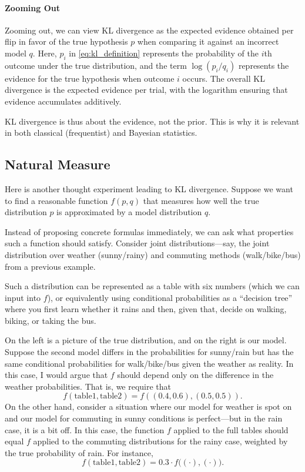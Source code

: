 \documentclass{article}
\begin{document}
\paragraph{Zooming Out}  
Zooming out, we can view KL divergence as the expected evidence obtained per flip in favor of the true hypothesis \(p\) when comparing it against an incorrect model \(q\). Here, \(p_i\) in \cref{eq:kl_definition} represents the probability of the \(i\)th outcome under the true distribution, and the term \(\log(p_i/q_i)\) represents the evidence for the true hypothesis when outcome \(i\) occurs. The overall KL divergence is the expected evidence per trial, with the logarithm ensuring that evidence accumulates additively.

KL divergence is thus about the evidence, not the prior. This is why it is relevant in both classical (frequentist) and Bayesian statistics.

\subsection{Natural Measure}


Here is another thought experiment leading to KL divergence. Suppose we want to find a reasonable function \(f(p,q)\) that measures how well the true distribution \(p\) is approximated by a model distribution \(q\).

Instead of proposing concrete formulas immediately, we can ask what properties such a function should satisfy. Consider joint distributions—say, the joint distribution over weather (sunny/rainy) and commuting methods (walk/bike/bus) from a previous example.

Such a distribution can be represented as a table with six numbers (which we can input into \(f\)), or equivalently using conditional probabilities as a ``decision tree'' where you first learn whether it rains and then, given that, decide on walking, biking, or taking the bus.

On the left is a picture of the true distribution, and on the right is our model. Suppose the second model differs in the probabilities for sunny/rain but has the same conditional probabilities for walk/bike/bus given the weather as reality. In this case, I would argue that \(f\) should depend only on the difference in the weather probabilities. That is, we require that
\[
f(\text{table1}, \text{table2}) = f((0.4, 0.6), (0.5, 0.5)).
\]
On the other hand, consider a situation where our model for weather is spot on and our model for commuting in sunny conditions is perfect—but in the rain case, it is a bit off. In this case, the function \(f\) applied to the full tables should equal \(f\) applied to the commuting distributions for the rainy case, weighted by the true probability of rain. For instance,
\[
f(\text{table1}, \text{table2}) = 0.3\cdot f\bigl((\cdot), (\cdot)\bigr).
\]
\end{document}
